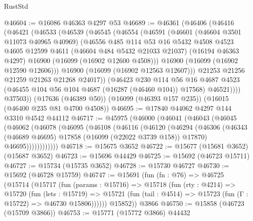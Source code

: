 \begin{lexlean}{RustStd}
\begin{coremodule}
@46604 := @16086 @46363 @4297 @53
@46689 := @46361
    (@46406
      (@46416
        (@46421
          (@46533
            (@46539
              (@46545
                (@46554
                  (@46591
                    (@46601
                      (@46604 @3501 @11073 @40965 @40969)
                      (@46556
                        @485
                        @114
                        @53
                        @16
                        @5432
                        @4508
                        @4523
                        @4605
                        @12599
                        @4611
                        (@46604 @484 @5432 @21033 @21037)
                        (@16194 @46363 @4297)
                        @16900
                        (@16099 (@16902 @12600 @4508)))
                      @16900
                      (@16099 (@16902 @12590 @12606)))
                    @16900
                    (@16099 (@16902 @12563 @12607)))
                  @21253
                  @21256
                  @21259
                  @21263
                  @21268
                  @24017))
              (@46423
                @230
                @114
                @56
                @16
                @4687
                @4523
                (@46455 @104 @56 @104 @4687 (@16287 (@46460 @104)) @17568)
                @46521))))
        @37503))
    (@17636 (@46389 @50))
    (@16099 (@46393 @157 @235))
    (@16015 (@46400 @235 @81 @4700 @4508))
@46695 := @17840 @44062 @4297 @144 @3310 @4542 @44112
@46717 := @45975
    (@46000
      (@46041
        (@46043
          (@46045
            (@46062
              (@46078
                (@46095
                  (@46108
                    (@46116
                      (@46120
                        (@46294
                          (@46306
                            (@46343 (@46689 @46695) @17858 (@16099 (@22022 @3739 @158)) @17870)
                            @46695))))))))))))
@46718 := @15675 @3652
@46722 := @15677 (@15681 @3652) (@15687 @3652)
@46723 := @15696 @44429
@46725 := @15692 (@46723 @15711)
@46727 := @15734 (@15735 @3652)
@46728 := @15730 @46727
@46730 := @15692 (@46728 @15759)
@46747 := @15691
    (fun (fn : @76) =>
    @46725
      (@15714
        (@15717
          (fun (params : @15716) =>
          @15718
            (fun (rty : @4214) =>
            @15720
              (fun (lets : @15719) =>
              @15721 (fun (tail : @4514) => @15723 (fun (Γ : @15722) => @46730 @15806))))))
        @15852))
    @3866
@46750 := @15858 (@46723 (@15709 @3866))
@46753 := @15771 (@15772 @3866) @44432

\end{coremodule}
\end{lexlean}
